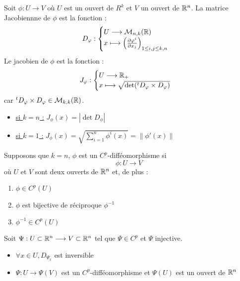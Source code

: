 \begin{definition}
    Soit $ \phi : U \rightarrow V$ où $U$ est un ouvert de $R^k$ et $V$ un ouvert de $\mathbb{R}^n$. La matrice Jacobiennne de $\phi$ est la fonction :
        \[ D_\varphi :
            \begin{cases}
                U \longrightarrow \mathcal{M}_{n,k}(\mathbb{R}) \\
                x \longmapsto \Bigl( \frac{\partial \varphi ^i}{\partial x_j} \Bigr) _{1 \leq i,j \leq k,n}
            \end{cases} \] 
    Le jacobien de $\phi$ est la fonction :
        \[ J_\varphi :
            \begin{cases}
                U \longrightarrow \mathbb{R}_+ \\ 
                x \longmapsto \sqrt{\det (^t D_\varphi \times D_\varphi)}
            \end{cases}
        \]
        car $^t D_\varphi \times D_\varphi \in \mathcal{M}_{k,k}(\mathbb{R})$.
    \begin{itemize}
        \item \underline{si $k = n$ :} $ \boxed{J_\phi(x) = | \det D_\phi |} $
        \item \underline{si $ k =1$ :} $ J_\phi(x) = \sqrt{\sum_{i=1}^{n} \phi^{i}(x)} = \| \phi'(x) \|$  
    \end{itemize}
\end{definition}

\begin{definition}[$C^p$-difféomorphisme]
    Supposons que $k=n$, $\phi$ est un $C^p$-difféomorphisme si 
    \[ \phi : U \longrightarrow V \]
    où $U$ et $V$ sont deux ouverts de $\mathbb{R}^n$ et, de plus :
    \begin{enumerate}
        \item $\phi \in C^p(U)$ 
        \item $\phi$ est bijective de réciproque $\phi^{-1}$
        \item $\phi^{-1} \in C^p(U)$ 
    \end{enumerate}
\end{definition}

\begin{theorem}
    Soit $\Psi : U \subset \mathbb{R}^n \longrightarrow V \subset \mathbb{R}^n$ tel que $\Psi \in C^p$ et $\Psi$ injective. 
    \begin{itemize}
        \item[\underline{si}] $ \forall x \in U, D_{\Psi_x}$ est inversible
        \item[\underline{alors}]  $\Psi : U \longrightarrow \Psi(V)$ est un $C^p$-difféomorphisme et $\Psi(U)$ est un ouvert de $\mathbb{R}^n$
    \end{itemize}
\end{theorem}

